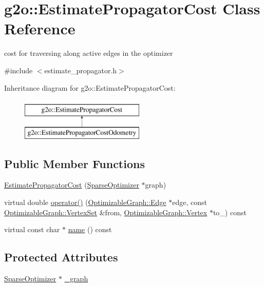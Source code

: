 \hypertarget{classg2o_1_1_estimate_propagator_cost}{}\section{g2o\+:\+:Estimate\+Propagator\+Cost Class Reference}
\label{classg2o_1_1_estimate_propagator_cost}


cost for traversing along active edges in the optimizer  




{\ttfamily \#include $<$estimate\+\_\+propagator.\+h$>$}

Inheritance diagram for g2o\+:\+:Estimate\+Propagator\+Cost\+:\begin{figure}[H]
\begin{center}
\leavevmode
\includegraphics[height=2.000000cm]{classg2o_1_1_estimate_propagator_cost}
\end{center}
\end{figure}
\subsection*{Public Member Functions}
\begin{DoxyCompactItemize}
\item 
\mbox{\hyperlink{classg2o_1_1_estimate_propagator_cost_aebd56e3597a99b225bc3799ec8145bc9}{Estimate\+Propagator\+Cost}} (\mbox{\hyperlink{classg2o_1_1_sparse_optimizer}{Sparse\+Optimizer}} $\ast$graph)
\item 
virtual double \mbox{\hyperlink{classg2o_1_1_estimate_propagator_cost_a1234b3b82be9b8448cc62b18625adfa6}{operator()}} (\mbox{\hyperlink{classg2o_1_1_optimizable_graph_1_1_edge}{Optimizable\+Graph\+::\+Edge}} $\ast$edge, const \mbox{\hyperlink{classg2o_1_1_hyper_graph_a703938cdb4bb636860eed55a2489d70c}{Optimizable\+Graph\+::\+Vertex\+Set}} \&from, \mbox{\hyperlink{classg2o_1_1_optimizable_graph_1_1_vertex}{Optimizable\+Graph\+::\+Vertex}} $\ast$to\+\_\+) const
\item 
virtual const char $\ast$ \mbox{\hyperlink{classg2o_1_1_estimate_propagator_cost_a49846dd23f5d49df6e1fc5c2ff854fca}{name}} () const
\end{DoxyCompactItemize}
\subsection*{Protected Attributes}
\begin{DoxyCompactItemize}
\item 
\mbox{\hyperlink{classg2o_1_1_sparse_optimizer}{Sparse\+Optimizer}} $\ast$ \mbox{\hyperlink{classg2o_1_1_estimate_propagator_cost_adf778ed8de5b54eb934e88107fe77980}{\+\_\+graph}}
\end{DoxyCompactItemize}


